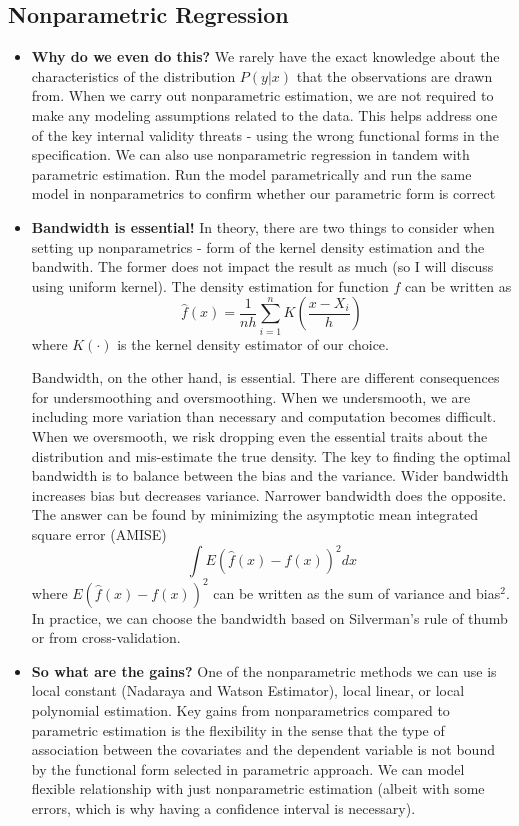 \documentclass[12pt]{article}
\theoremstyle{definition}
\theoremstyle{property}
\theoremstyle{assumption}
\theoremstyle{example}
\theoremstyle{comment}
\begin{document}
\subsection{Nonparametric Regression}
\begin{itemize}
\item \textbf{Why do we even do this?} We rarely have the exact knowledge about the characteristics of the distribution $P(y|x)$ that the observations are drawn from. When we carry out nonparametric estimation, we are not required to make any modeling assumptions related to the data. This helps address one of the key internal validity threats - using the wrong functional forms in the specification. We can also use nonparametric regression in tandem with parametric estimation. Run the model parametrically and run the same model in nonparametrics to confirm whether our parametric form is correct
\item \textbf{Bandwidth is essential!} In theory, there are two things to consider when setting up nonparametrics - form of the kernel density estimation and the bandwith. The former does not impact the result as much (so I will discuss using uniform kernel). The density estimation for function $f$ can be written as
\[
\hat{f}(x)=\frac{1}{nh}\sum_{i=1}^n K\left(\frac{x-X_i}{h}\right)
\]
where $K(\cdot)$ is the kernel density estimator of our choice. 
\par 
Bandwidth, on the other hand, is essential. There are different consequences for undersmoothing and oversmoothing. When we undersmooth, we are including more variation than necessary and computation becomes difficult. When we oversmooth, we risk dropping even the essential traits about the distribution and mis-estimate the true density. The key to finding the optimal bandwidth is to balance between the bias and the variance. Wider bandwidth increases bias but decreases variance. Narrower bandwidth does the opposite. The answer can be found by minimizing the asymptotic mean integrated square error (AMISE)
\[
\int E(\hat{f}(x)-f(x))^2dx
\]
where $E(\hat{f}(x)-f(x))^2$ can be written as the sum of variance and bias$^2$. In practice, we can choose the bandwidth based on Silverman's rule of thumb or from cross-validation. 
\item \textbf{So what are the gains?} One of the nonparametric methods we can use is local constant (Nadaraya and Watson Estimator), local linear, or local polynomial estimation. Key gains from nonparametrics compared to parametric estimation is the flexibility in the sense that the type of association between the covariates and the dependent variable is not bound by the functional form selected in parametric approach. We can model flexible relationship with just nonparametric estimation (albeit with some errors, which is why having a confidence interval is necessary).

\end{itemize}
\end{document}
